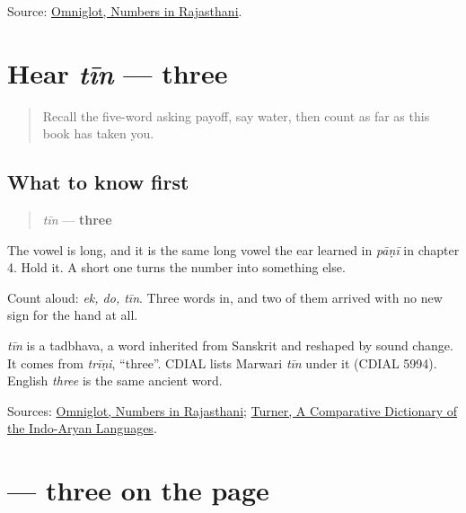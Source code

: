 \begin{tcolorbox}[breakable,colback=teal!4,colframe=teal!35!black,title={Before you move on}]
Source: \href{https://www.omniglot.com/language/numbers/rajasthani.htm}{Omniglot, Numbers in Rajasthani}.
\end{tcolorbox}
\section[tīn]{Hear \emph{tīn} — three}

\label{lesson:MW-C32-hear-teen}



\begin{quote}
Recall the five-word asking payoff, say water, then count as far as this book has taken you.
\end{quote}

\subsection*{What to know first}
\begin{quote}
\emph{tīn} — \textbf{three}
\end{quote}

The vowel is long, and it is the same long vowel the ear learned in \emph{pāṇī} in chapter 4. Hold it. A short one turns the number into something else.

Count aloud: \emph{ek, do, tīn}. Three words in, and two of them arrived with no new sign for the hand at all.

\begin{cousinweb}
\emph{tīn} is a tadbhava, a word inherited from Sanskrit and reshaped by sound change. It comes from \emph{trīṇi}, \textquotedblleft{}three\textquotedblright{}. CDIAL lists Marwari \emph{tīn} under it (CDIAL 5994). English \emph{three} is the same ancient word.
\end{cousinweb}

\begin{tcolorbox}[breakable,colback=teal!4,colframe=teal!35!black,title={Before you move on}]
Sources: \href{https://www.omniglot.com/language/numbers/rajasthani.htm}{Omniglot, Numbers in Rajasthani}; \href{https://dsal.uchicago.edu/dictionaries/soas/}{Turner, A Comparative Dictionary of the Indo-Aryan Languages}.
\end{tcolorbox}
\section[\texorpdfstring{\mw{तीन} (tīn)}{तीन (tīn)}]{ — three on the page}

